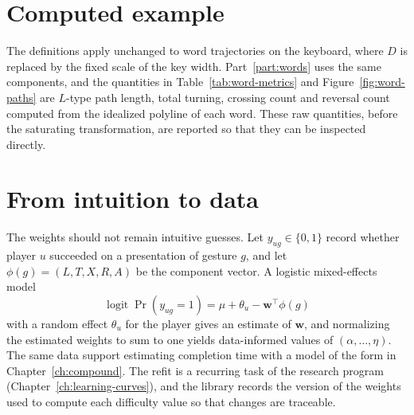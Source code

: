 \section{Computed example}

The definitions apply unchanged to word trajectories on the keyboard, where $D$ is replaced by the fixed scale of the key width. Part~\ref{part:words} uses the same components, and the quantities in Table~\ref{tab:word-metrics} and Figure~\ref{fig:word-paths} are $L$-type path length, total turning, crossing count and reversal count computed from the idealized polyline of each word. These raw quantities, before the saturating transformation, are reported so that they can be inspected directly.

\section{From intuition to data}

The weights should not remain intuitive guesses. Let $y_{ug}\in\{0,1\}$ record whether player $u$ succeeded on a presentation of gesture $g$, and let $\phi(g)=(L,T,X,R,A)$ be the component vector. A logistic mixed-effects model
\[
\operatorname{logit}\Pr(y_{ug}=1)=\mu+\theta_u-\mathbf{w}^{\top}\phi(g)
\]
with a random effect $\theta_u$ for the player gives an estimate of $\mathbf{w}$, and normalizing the estimated weights to sum to one yields data-informed values of $(\alpha,\dots,\eta)$. The same data support estimating completion time with a model of the form in Chapter~\ref{ch:compound}. The refit is a recurring task of the research program (Chapter~\ref{ch:learning-curves}), and the library records the version of the weights used to compute each difficulty value so that changes are traceable.\evS

